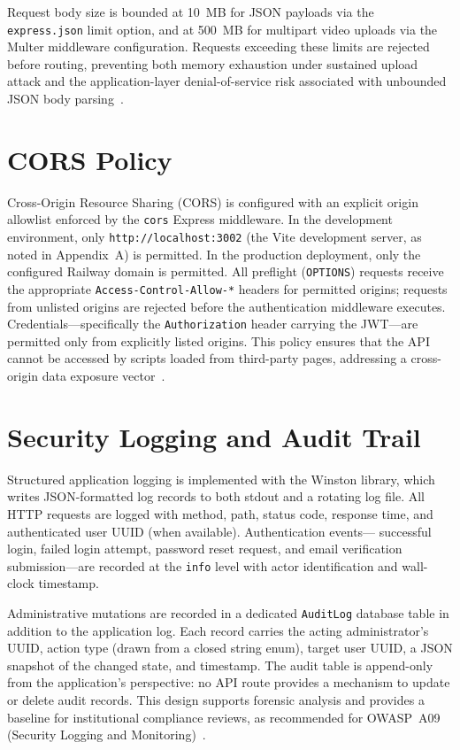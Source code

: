 Request body size is bounded at 10~MB for JSON payloads via the
\texttt{express.json} limit option, and at 500~MB for multipart video
uploads via the Multer middleware configuration. Requests exceeding these
limits are rejected before routing, preventing both memory exhaustion under
sustained upload attack and the application-layer denial-of-service risk
associated with unbounded JSON body parsing~\cite{owasp2021}.

\section{CORS Policy}
\label{sec:cors}

Cross-Origin Resource Sharing (CORS) is configured with an explicit
origin allowlist enforced by the \texttt{cors} Express middleware. In the
development environment, only \texttt{http://localhost:3002} (the Vite
development server, as noted in Appendix~A) is permitted. In the production
deployment, only the configured Railway domain is permitted. All
preflight (\texttt{OPTIONS}) requests receive the appropriate
\texttt{Access-Control-Allow-*} headers for permitted origins; requests
from unlisted origins are rejected before the authentication middleware
executes. Credentials---specifically the \texttt{Authorization} header
carrying the JWT---are permitted only from explicitly listed origins.
This policy ensures that the API cannot be accessed by scripts loaded from
third-party pages, addressing a cross-origin data exposure vector~\cite{owasp2021}.

\section{Security Logging and Audit Trail}
\label{sec:logging}

Structured application logging is implemented with the Winston library,
which writes JSON-formatted log records to both stdout and a rotating log
file. All HTTP requests are logged with method, path, status code, response
time, and authenticated user UUID (when available). Authentication events---
successful login, failed login attempt, password reset request, and email
verification submission---are recorded at the \texttt{info} level with
actor identification and wall-clock timestamp.

Administrative mutations are recorded in a dedicated \texttt{AuditLog}
database table in addition to the application log. Each record carries the
acting administrator's UUID, action type (drawn from a closed string enum),
target user UUID, a JSON snapshot of the changed state, and timestamp. The
audit table is append-only from the application's perspective: no API route
provides a mechanism to update or delete audit records. This design
supports forensic analysis and provides a baseline for institutional
compliance reviews, as recommended for OWASP~A09 (Security Logging and
Monitoring)~\cite{owasp2021}.

